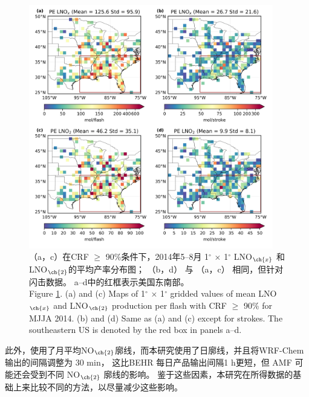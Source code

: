 \begin{figure}[H]
\centering
\includegraphics[width=0.95\textwidth]{./figures/us_pe_sum.png}
\caption{（a，c）在CRF $\geq$ 90\%条件下，2014年5--8月 1$^{\circ}$ $\times$ 1$^{\circ}$ LNO$_{\ch{x}}$ 和LNO$_{\ch{2}}$的平均产率分布图；
     （b，d） 与 （a，c） 相同，但针对闪击数据。
     a--d中的红框表示美国东南部。\\
     Figure \ref{fig:us_pe_sum}. (a) and (c) Maps of 1$^{\circ}$ $\times$ 1$^{\circ}$ gridded values of mean LNO$_{\ch{x}}$
    and LNO$_{\ch{2}}$ production per flash with CRF $\geq$ 90\% for MJJA 2014.
    (b) and (d) Same as (a) and (c) except for strokes.
    The southeastern US is denoted by the red box in panels a--d.
}
\label{fig:us_pe_sum}
\end{figure}


此外，\citet{Lapierre.2020}使用了月平均NO$_{\ch{2}}$廓线，而本研究使用了日廓线，并且将WRF-Chem 输出的间隔调整为 30 min，
这比BEHR 每日产品输出间隔1 h更短，但 AMF 可能还会受到不同 NO$_{\ch{2}}$ 廓线的影响。
鉴于这些因素，本研究在所得数据的基础上来比较不同的方法，以尽量减少这些影响。

